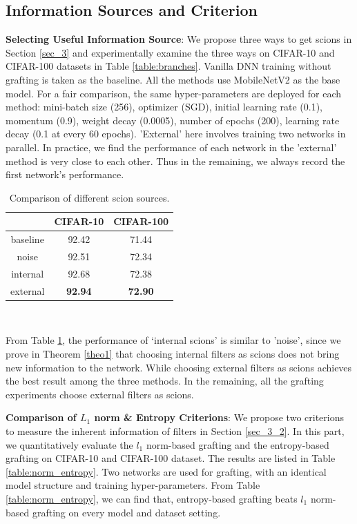 \documentclass{article}
\begin{document}
\subsection{Information Sources and Criterion}\label{sec_4_1}

\textbf{Selecting Useful Information Source}: We propose three ways to get scions in Section \ref{sec_3} and experimentally examine the three ways on CIFAR-10 and CIFAR-100 datasets \cite{cifar10} in Table \ref{table:branches}. Vanilla DNN training without grafting is taken as the baseline. All the methods use MobileNetV2 as the base model. For a fair comparison, the same hyper-parameters are deployed for each method: mini-batch size (256), optimizer (SGD), initial learning rate (0.1), momentum (0.9), weight decay (0.0005), number of epochs (200), learning rate decay (0.1 at every 60 epochs).
'External' here involves training two networks in parallel. In practice, we find the performance of each network in the 'external' method is very close to each other. Thus in the remaining, we always record the first network's performance. 



\begin{table}[!h]
	\caption{Comparison of different scion sources. }
	\begin{center}
		\begin{tabular}{|c|c|c|} 
			\hline 
			&CIFAR-10 &CIFAR-100\\ 
			\hline
			baseline&92.42&71.44\\
			noise&92.51&72.34\\
			internal&92.68&72.38\\
			external&\textbf{92.94}&\textbf{72.90}\\
			\hline
		\end{tabular}\\
	\end{center}
	\label{table:4_1}
\end{table}

From Table \ref{table:4_1}, the performance of `internal scions' is similar to 'noise', since we prove in Theorem \ref{theo1} that choosing internal filters as scions does not bring new information to the network. While choosing external filters as scions achieves the best result among the three methods. In the remaining, all the grafting experiments choose external filters as scions.


\textbf{Comparison of $L_{1}$ norm \& Entropy Criterions}: We propose two criterions to measure the inherent information of filters in Section \ref{sec_3_2}. In this part, we quantitatively evaluate the $l_{1}$ norm-based grafting and the entropy-based grafting on CIFAR-10 and CIFAR-100 dataset. The results are listed in Table \ref{table:norm_entropy}. Two networks are used for grafting, with an identical model structure and training hyper-parameters. From Table \ref{table:norm_entropy}, we can find that, entropy-based grafting beats $l_{1}$ norm-based grafting on every model and dataset setting.
\end{document}
